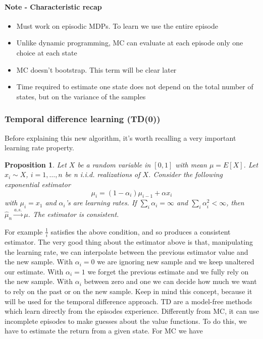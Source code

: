 \documentclass[main.tex]{subfiles}
\newtheorem{proposition}{Proposition}[section]
\begin{document}
\paragraph{Note - Characteristic recap}
\begin{itemize}
    \item Must work on episodic MDPs. To learn we use the entire episode
    \item Unlike dynamic programming, MC can evaluate at each episode only one choice at each state
    \item MC doesn't bootstrap. This term will be clear later
    \item Time required to estimate one state does not depend on the total number of states, but on the variance of the samples
\end{itemize}
\newpage
\subsubsection{Temporal difference learning (TD(0))}
Before explaining this new algorithm, it's worth recalling a very important learning rate property.
\begin{proposition}
Let $X$ be a random variable in $[0, 1]$ with mean $\mu = E[X]$. Let $x_i \sim X$, $i=1,\dots,n$ be n i.i.d. realizations of $X$.
Consider the following exponential estimator
\begin{equation*}
    \mu_i = (1-\alpha_i) \mu_{i-1} + \alpha x_i
\end{equation*}
with $\mu_i=x_1$ and $\alpha_i$'s are learning rates.
\newline
If $\sum_i \alpha_i = \infty$ and $\sum_i \alpha_i^2 < \infty$, then $\hat{\mu}_n \overset{a.s.}{\rightarrow} \mu$. The estimator is consistent.
\end{proposition}
For example $\frac{1}{i}$ satisfies the above condition, and so produces a consistent estimator.
The very good thing about the estimator above is that, manipulating the learning rate, we can interpolate between the previous estimator value and the new sample. With $\alpha_i=0$ we are ignoring new sample and we keep unaltered our estimate. With $\alpha_i = 1$ we forget the previous estimate and we fully rely on the new sample. With $\alpha_i$ between zero and one we can decide how much we want to rely on the past or on the new sample. Keep in mind this concept, because it will be used for the temporal difference approach.
TD are a model-free methods which learn directly from the episodes experience. Differently from MC, it can use incomplete episodes to make guesses about the value functions. To do this, we have to estimate the return from a given state. For MC we have
\end{document}
